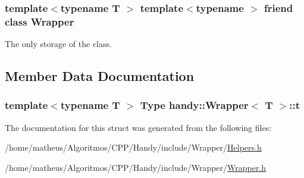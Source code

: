 \subsubsection[{\texorpdfstring{Wrapper}{Wrapper}}]{\setlength{\rightskip}{0pt plus 5cm}template$<$typename T $>$ template$<$typename $>$ friend class {\bf Wrapper}\hspace{0.3cm}{\ttfamily [friend]}}\hypertarget{structhandy_1_1Wrapper_af0ee8fe701d964b31d6a6f269085bf54}{}\label{structhandy_1_1Wrapper_af0ee8fe701d964b31d6a6f269085bf54}


The only storage of the class. 



\subsection{Member Data Documentation}
\subsubsection[{\texorpdfstring{t}{t}}]{\setlength{\rightskip}{0pt plus 5cm}template$<$typename T $>$ {\bf Type} {\bf handy\+::\+Wrapper}$<$ T $>$\+::t\hspace{0.3cm}{\ttfamily [protected]}}\hypertarget{structhandy_1_1Wrapper_a5ac97b2a85fe9e4cc066766bdbaf75e5}{}\label{structhandy_1_1Wrapper_a5ac97b2a85fe9e4cc066766bdbaf75e5}


The documentation for this struct was generated from the following files\+:\begin{DoxyCompactItemize}
\item 
/home/matheus/\+Algoritmos/\+C\+P\+P/\+Handy/include/\+Wrapper/\hyperlink{Wrapper_2Helpers_8h}{Helpers.\+h}\item 
/home/matheus/\+Algoritmos/\+C\+P\+P/\+Handy/include/\+Wrapper/\hyperlink{Wrapper_8h}{Wrapper.\+h}\end{DoxyCompactItemize}
